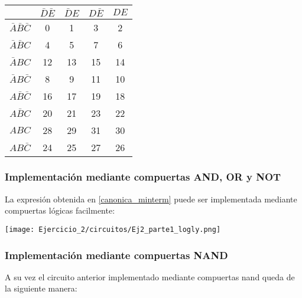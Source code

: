     \pagebreak

    \begin{table}[H]
        \begin{center}
            \def\arraystretch{1.5}
            \begin{tabular}{|c|c|c|c|c|}
                \hline
                &	$\bar{D}\bar{E}$ &	$\bar{D}E$ &	$D\bar{E}$ & $DE$ \\
                \hline
                $\bar{A}\bar{B}\bar{C}$ & 0 & 1 & 3 & 2 \\
                \hline          
                $\bar{A}\bar{B}C$ & 4 & 5 & 7 & 6 \\
                \hline   
                $\bar{A}BC$ & 12 & 13 & 15 & 14 \\
                \hline     
                $\bar{A}B\bar{C}$  & 8 & 9 & 11 & 10 \\
                \hline
                
                $A\bar{B}\bar{C}$ & 16 & 17 & 19 & 18 \\
                
                \hline
                
                $A\bar{B}C$ & 20 & 21 & 23 & 22 \\
                \hline
                
                $ABC$ & 28 & 29 & 31 & 30 \\
                \hline
                
                $AB\bar{C}$ & 24 & 25 & 27 & 26 \\
                \hline
                
            \end{tabular}
        \end{center}

    \end{table}


\subsubsection{Implementación mediante compuertas AND, OR y NOT}

La expresión obtenida en \ref{canonica_minterm} puede ser implementada mediante compuertas lógicas facilmente:

\texttt{[image: Ejercicio\_2/circuitos/Ej2\_parte1\_logly.png]}


\subsubsection{Implementación mediante compuertas NAND}
A su vez el circuito anterior implementado mediante compuertas nand queda de la siguiente manera:

